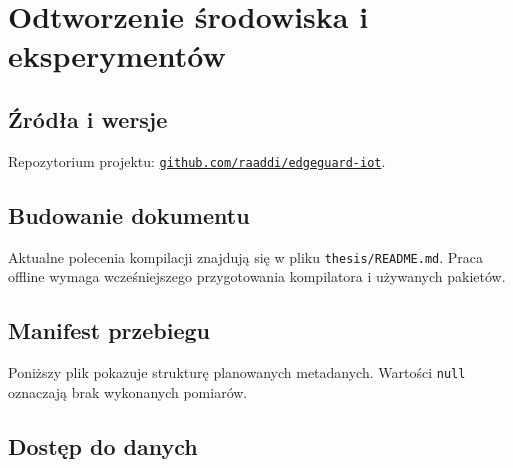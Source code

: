 \chapter{Odtworzenie środowiska i eksperymentów}
\label{app:reproduction}
\section{Źródła i wersje}
Repozytorium projektu: \href{\ThesisRepository}{\texttt{github.com/raaddi/edgeguard-iot}}.
\section{Budowanie dokumentu}
Aktualne polecenia kompilacji znajdują się w pliku \texttt{thesis/README.md}. Praca offline wymaga wcześniejszego przygotowania kompilatora i używanych pakietów.
\section{Manifest przebiegu}
Poniższy plik pokazuje strukturę planowanych metadanych. Wartości \texttt{null} oznaczają brak wykonanych pomiarów.
\par\noindent\begin{minipage}{\linewidth}
\end{minipage}\par
\section{Dostęp do danych}
